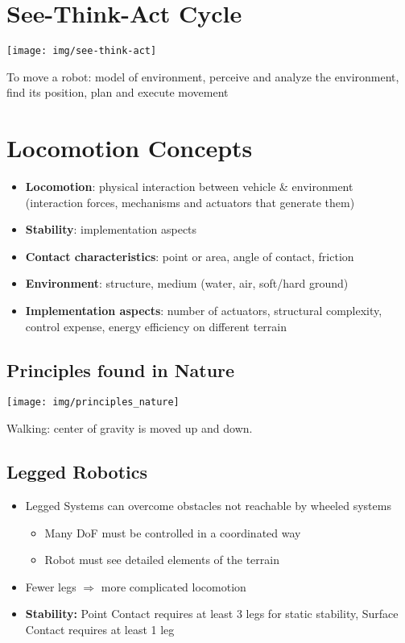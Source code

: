 \documentclass[fontsize=6pt]{scrartcl}
\begin{document}
\raggedcolumns
\setlength{\abovedisplayskip}{4.0pt plus 2.0pt minus 2.0pt}
\setlength{\belowdisplayskip}{4.0pt plus 2.0pt minus 2.0pt}

\begin{multicols*}{4}
\section*{See-Think-Act Cycle}

{\centering
\texttt{[image: img/see-think-act]}
\par}

To move a robot: model of environment, perceive and analyze the environment, find its position, plan
and execute movement

\section*{Locomotion Concepts}
\begin{itemize}
	\item \textbf{Locomotion}:  physical interaction between vehicle \& environment (interaction
		forces, mechanisms and actuators that generate them)
	\item \textbf{Stability}:  implementation aspects
	\item \textbf{Contact characteristics}:  point or area, angle of contact, friction
	\item \textbf{Environment}:  structure, medium (water, air, soft/hard ground)
	\item \textbf{Implementation aspects}:  number of actuators, structural complexity, control
		expense, energy efficiency on different terrain
\end{itemize}

\subsection*{Principles found in Nature}
{\centering
	\texttt{[image: img/principles\_nature]}
\par}

Walking: center of gravity is moved up and down.

\subsection*{Legged Robotics}
\begin{itemize}
	\item Legged Systems can overcome obstacles not reachable by wheeled systems
	\begin{itemize}
		\item Many DoF must be controlled in a coordinated way
		\item Robot must see detailed elements of the terrain
	\end{itemize}
	\item Fewer legs $\Rightarrow$ more complicated locomotion
	\item \textbf{Stability:} Point Contact requires at least 3 legs for static stability, Surface
		Contact requires at least 1 leg
\end{itemize}


\end{multicols*}
\end{document}
